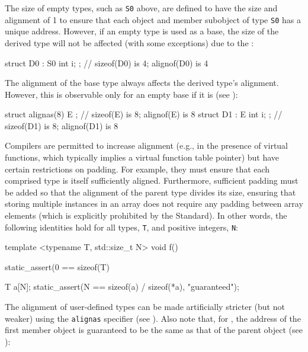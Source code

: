 \noindent The size of empty types, such as \lstinline!S0! above, are defined to have the size and alignment of 1 to ensure that each object and member subobject of type \lstinline!S0! has a unique address. However, if an empty type is used as a base, the size of the derived type will not be affected (with some exceptions) due to the  :

\begin{emcppslisting}
struct D0 : S0 { int i; };  // sizeof(D0) is 4; alignof(D0) is 4
\end{emcppslisting}

The alignment of the base type always affects the derived type's alignment. However, this is observable only for an empty base if it is  (see ):

\begin{emcppslisting}
struct alignas(8) E { };   // sizeof(E)  is 8; alignof(E)  is 8
struct D1 : E { int i; };  // sizeof(D1) is 8; alignof(D1) is 8
\end{emcppslisting}

Compilers are permitted to increase alignment
(e.g., in the presence of virtual functions, which typically implies a virtual function table pointer) but have certain restrictions
on padding. For example, they must ensure that each comprised type is
itself sufficiently aligned.  Furthermore, sufficient padding must be added so that the alignment of the parent type divides its size, ensuring that storing multiple instances in an
array does not require any padding between array elements (which is explicitly prohibited by the Standard). In other words, the following identities hold for all types, \lstinline!T!, and positive integers,
\lstinline!N!:

\begin{emcppslisting}
template <typename T, std::size_t N>                                            
void f()                                                                        
{                                                                               
    static_assert(0 == sizeof(T) %
                                 
    T a[N];                                                                     
    static_assert(N == sizeof(a) / sizeof(*a), "guaranteed");                                 
}
\end{emcppslisting}
    
\noindent The alignment of user-defined types can be made artificially stricter
  (but not weaker) using the \lstinline!alignas! specifier (see ).
  Also note that, for , the address of the
  first member object is guaranteed to be the same as that of the parent
  object (see ):

